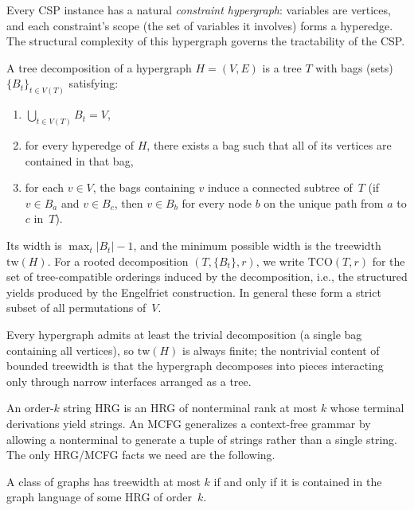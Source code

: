 \documentclass[runningheads]{llncs}
\begin{document}
Every CSP instance has a natural \emph{constraint hypergraph}: variables are vertices, and each constraint's scope (the set of variables it involves) forms a hyperedge. The structural complexity of this hypergraph governs the tractability of the CSP.

\begin{definition}\label{def:treedecomp}
A tree decomposition of a hypergraph $H = (V, E)$ is a tree $T$ with bags (sets) $\{B_t\}_{t \in V(T)}$ satisfying:
\begin{enumerate}[nosep,label=(T\arabic*)]
  \item\label{td:cover} $\bigcup_{t \in V(T)} B_t = V$,
  \item\label{td:edge} for every hyperedge of $H$, there exists a bag such that all of its vertices are contained in that bag,
  \item\label{td:subtree} for each $v \in V$, the bags containing $v$ induce a connected subtree of~$T$ (if $v \in B_a$ and $v \in B_c$, then $v \in B_b$ for every node $b$ on the unique path from $a$ to $c$ in~$T$).
\end{enumerate}
Its width is $\max_t |B_t| - 1$, and the minimum possible width is the treewidth $\mathrm{tw}(H)$.\label{def:treewidth}
For a rooted decomposition $(T, \{B_t\}, r)$, we write $\mathrm{TCO}(T, r)$ for the set of tree-compatible orderings induced by the decomposition, i.e., the structured yields produced by the Engelfriet construction. In general these form a strict subset of all permutations of~$V$.\label{def:tree-compatible-ordering}
\end{definition}

Every hypergraph admits at least the trivial decomposition (a single bag containing all vertices), so $\mathrm{tw}(H)$ is always finite; the nontrivial content of bounded treewidth is that the hypergraph decomposes into pieces interacting only through narrow interfaces arranged as a tree.

An order-$k$ string HRG is an HRG of nonterminal rank at most $k$ whose terminal derivations yield strings. An MCFG generalizes a context-free grammar by allowing a nonterminal to generate a tuple of strings rather than a single string. The only HRG/MCFG facts we need are the following.

\begin{theorem}\label{thm:hrg-tw}
A class of graphs has treewidth at most $k$ if and only if it is contained in the graph language of some HRG of order~$k$.
\end{theorem}
\end{document}
